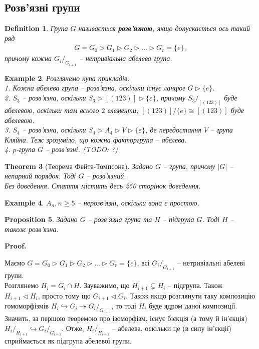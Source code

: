 \documentclass[a4paper, 10pt]{article}
\makeatletter
\theoremstyle{theoremdd}
\newtheorem{theorem}{Theorem}[subsection]
\theoremstyle{theoremdd}
\newtheorem{definition}[theorem]{Definition}
\theoremstyle{theoremdd}
\theoremstyle{theoremdd}
\theoremstyle{theoremdd}
\newtheorem{example}[theorem]{Example}
\theoremstyle{theoremdd}
\theoremstyle{theoremdd}
\theoremstyle{theoremdd}
\theoremstyle{theoremdd}
\newtheorem{proposition}[theorem]{Proposition}
\theoremstyle{theoremdd}
\theoremstyle{theoremdd}
\theoremstyle{theoremdd}
\theoremstyle{theoremdd}
\theoremstyle{theoremdd}
\theoremstyle{theoremdd}
\renewenvironment{proof}[1][Proof.\\]{\par
\pushQED{\hfill \qed}%
\normalfont \topsep6\p@\@plus6\p@\relax
\trivlist
\item\relax
{\bfseries
#1\@addpunct{.}}\hspace\labelsep\ignorespaces
}{%
\popQED\endtrivlist\@endpefalse
}
\makeatother
\begin{document}
\subsection{Розв'язні групи}
\begin{definition}
Група $G$ називається \textbf{розв'язною}, якщо допускається ось такий ряд
\begin{align*}
G = G_0 \triangleright G_1 \triangleright G_2 \triangleright \dots \triangleright G_r = \{e\},
\end{align*}
причому кожна ${G_i}/_{G_{i+1}}$ -- нетривіальна абелева група.
\end{definition}

\begin{example}
Розглянемо купа прикладів:\\
1. Кожна абелева група -- розв'язна, оскільки існує ланцюг $G \triangleright \{e\}$.
\bigskip \\
2. $S_3$ -- розв'язна, оскільки $S_3 \triangleright [(123)] \triangleright \{\varepsilon\}$, причому $S_3/_{[(123)]}$ буде абелевою, оскільки там всього $2$ елементи; $[(123)]/{\{e\}} \cong [(123)]$ буде абелевою. 
\bigskip \\
3. $S_4$ -- розв'язна, оскільки $S_4 \triangleright A_4 \triangleright V \triangleright \{\varepsilon\}$, де передостання $V$ -- група Кляйна. Теж зрозуміло, що кожна факторгрупа -- абелева.
\bigskip \\
4. $p$-група $G$ -- розв'язні. (TODO: ?)
\end{example}

\begin{theorem}[Теорема Фейта-Томпсона]
Задано $G$ -- група, причому $|G|$ -- непарний порядок. Тоді $G$ -- розв'язний.\\
\textit{Без доведення. Стаття містить десь 250 сторінок доведення.}
\end{theorem}

\begin{example}
$A_n, n \geq 5$ -- нерозв'язні, оскільки вона є простою.
\end{example}

\begin{proposition}
Задано $G$ -- розв'язна група та $H$ -- підгрупа $G$. Тоді $H$ -- також розв'язна.
\end{proposition}

\begin{proof}
Маємо $G = G_0 \triangleright G_1 \triangleright G_2 \triangleright \dots \triangleright G_r = \{e\}$, всі ${G_i}/_{G_{i+1}}$ -- нетривіальні абелеві групи.\\
Розглянемо $H_i = G_i \cap H$. Зауважимо, що $H_{i+1} \subsetneq H_{i}$ -- підгрупа. Також $H_{i+1} \triangleleft H_i$, просто тому що $G_{i+1} \triangleleft G_i$. Також якщо розглянути таку композицію гомоморфізмів $H_i \hookrightarrow G_i \twoheadrightarrow {G_i}/_{G_{i+1}}$, то тоді $H_i$ буде ядром даної композиції. Значить, за першою теоремою про ізоморфізм, існує бієкція (а тому й ін'єкція) ${H_i}/_{H_{i+1}} \hookrightarrow {G_i}/_{G_{i+1}}$. Отже, ${H_i}/_{H_{i+1}}$ -- абелева, оскільки це (в силу ін'єкції) сприймається як підгрупа абелевої групи.
\end{proof}
\end{document}
